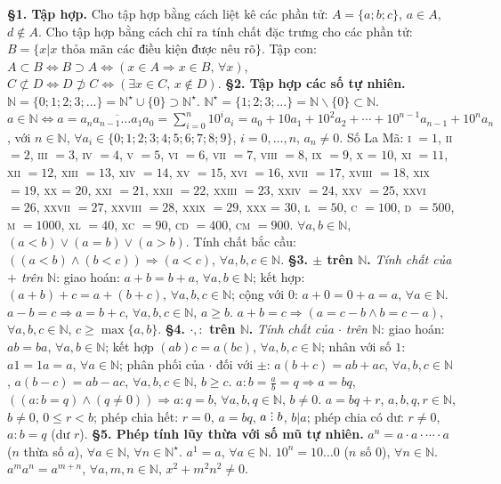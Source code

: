 \documentclass{article}
\numberwithin{equation}{section}
\DeclareRobustCommand{\divby}{%
	\mathrel{\vbox{\baselineskip.65ex\lineskiplimit0pt\hbox{.}\hbox{.}\hbox{.}}}%
}
\begin{document}
\textbf{\S1. Tập hợp.} Cho tập hợp bằng cách liệt kê các phần tử: $A = \{a;b;c\}$, $a\in A$, $d\notin A$. Cho tập hợp bằng cách chỉ ra tính chất đặc trưng cho các phần tử: $B = \{x|x\mbox{ thỏa mãn các điều kiện được nêu rõ}\}$. Tập con: $A\subset B\Leftrightarrow B\supset A\Leftrightarrow(x\in A\Rightarrow x\in B,\,\forall x)$, $C\not\subset D\Leftrightarrow D\not\supset C\Leftrightarrow(\exists x\in C,\,x\notin D)$. \textbf{\S2. Tập hợp các số tự nhiên.} $\mathbb{N} = \{0;1;2;3;\ldots\} = \mathbb{N}^\star\cup\{0\}\supset\mathbb{N}^\star$. $\mathbb{N}^\star = \{1;2;3;\ldots\} = \mathbb{N}\backslash\{0\}\subset\mathbb{N}$. $a\in\mathbb{N}\Leftrightarrow a = \overline{a_na_{n-1}\ldots a_1a_0} = \sum_{i=0}^n 10^ia_i = a_0 + 10a_1 + 10^2a_2 + \cdots + 10^{n-1}a_{n-1} + 10^na_n$, với $n\in\mathbb{N}$, $\forall a_i\in\{0;1;2;3;4;5;6;7;8;9\}$, $i = 0,\ldots,n$, $a_n\ne 0$. Số La Mã: \textsc{i} $= 1$, \textsc{ii} $= 2$, \textsc{iii} $= 3$, \textsc{iv} $= 4$, \textsc{v} $= 5$, \textsc{vi} $= 6$, \textsc{vii} $= 7$, \textsc{viii} $= 8$, \textsc{ix} $= 9$, \textsc{x} = $10$, \textsc{xi} $= 11$, \textsc{xii} $= 12$, \textsc{xiii} $= 13$, \textsc{xiv} $= 14$, \textsc{xv} $= 15$, \textsc{xvi} $= 16$, \textsc{xvii} $= 17$, \textsc{xviii} $= 18$, \textsc{xix} $= 19$, \textsc{xx} = $20$, \textsc{xxi} $= 21$, \textsc{xxii} $= 22$, \textsc{xxiii} $= 23$, \textsc{xxiv} $= 24$, \textsc{xxv} $= 25$, \textsc{xxvi} $= 26$, \textsc{xxvii} $= 27$, \textsc{xxviii} $= 28$, \textsc{xxix} $= 29$, \textsc{xxx} = $30$, \textsc{l} $= 50$, \textsc{c} $= 100$, \textsc{d} $= 500$, \textsc{m} $= 1000$, \textsc{xl} $= 40$, \textsc{xc} $= 90$, \textsc{cd} $= 400$, \textsc{cm} $= 900$. $\forall a,b\in\mathbb{N}$, $(a < b)\lor(a = b)\lor(a > b)$. Tính chất bắc cầu: $((a < b)\land(b < c))\Rightarrow(a < c)$, $\forall a,b,c\in\mathbb{N}$. \textbf{\S3. $\boldsymbol{\pm}$ trên $\mathbb{N}$.} \textit{Tính chất của $+$ trên $\mathbb{N}$}: giao hoán: $a + b = b + a$, $\forall a,b\in\mathbb{N}$; kết hợp: $(a + b) + c = a + (b + c)$, $\forall a,b,c\in\mathbb{N}$; cộng với $0$: $a + 0 = 0 + a = a$, $\forall a\in\mathbb{N}$. $a - b = c\Rightarrow a = b + c$, $\forall a,b,c\in\mathbb{N}$, $a\ge b$. $a + b = c\Rightarrow(a = c - b\land b = c - a)$, $\forall a,b,c\in\mathbb{N}$, $c\ge\max\{a,b\}$. \textbf{\S4. $\boldsymbol{\cdot,:}$ trên $\mathbb{N}$.} \textit{Tính chất của $\cdot$ trên $\mathbb{N}$}: giao hoán: $ab = ba$, $\forall a,b\in\mathbb{N}$; kết hợp $(ab)c = a(bc)$, $\forall a,b,c\in\mathbb{N}$; nhân với số $1$: $a1 = 1a = a$, $\forall a\in\mathbb{N}$; phân phối của $\cdot$ đối với $\pm$: $a(b + c) = ab + ac$, $\forall a,b,c\in\mathbb{N}$, $a(b - c) = ab - ac$, $\forall a,b,c\in\mathbb{N}$, $b\ge c$. $a:b = \frac{a}{b} = q\Rightarrow a = bq$, $((a:b = q)\land(q\ne 0))\Rightarrow a:q = b$, $\forall a,b,q\in\mathbb{N}$, $b\ne 0$. $a = bq + r$, $a,b,q,r\in\mathbb{N}$, $b\ne 0$, $0\le r < b$; phép chia hết: $r = 0$, $a = bq$, $a\divby b$, $b|a$; phép chia có dư: $r\ne 0$, $a:b = q$ (dư $r$). \textbf{\S5. Phép  tính lũy thừa với số mũ tự nhiên.} $a^n = a\cdot a\cdot\cdots\cdot a$ ($n$ thừa số $a$), $\forall a\in\mathbb{N}$, $\forall n\in\mathbb{N}^\star$. $a^1 = a$, $\forall a\in\mathbb{N}$. $10^n = 10\ldots 0$ ($n$ số $0$), $\forall n\in\mathbb{N}$. $a^ma^n = a^{m+n}$, $\forall a,m,n\in\mathbb{N}$, $x^2 + m^2n^2\ne 0$. 
\end{document}
